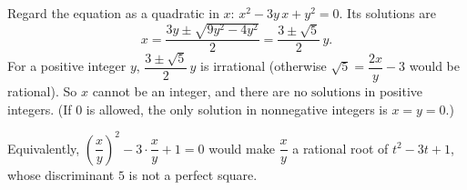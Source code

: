 Regard the equation as a quadratic in $x$: $x^2-3y\,x+y^2=0$. Its solutions are
\[
x=\dfrac{3y\pm\sqrt{9y^2-4y^2}}{2}=\dfrac{3\pm\sqrt5}{2}\,y .
\]
For a positive integer $y$, $\dfrac{3\pm\sqrt5}{2}\,y$ is irrational (otherwise $\sqrt5=\dfrac{2x}{y}-3$ would be rational). So $x$ cannot be an integer, and there are $\boxed{\text{no solutions}}$ in positive integers. (If $0$ is allowed, the only solution in nonnegative integers is $x=y=0$.)

Equivalently, $\left(\dfrac {x}{y}\right)^2-3\cdot\dfrac {x}{y}+1=0$ would make $\dfrac {x}{y}$ a rational root of $t^2-3t+1$, whose discriminant $5$ is not a perfect square.
